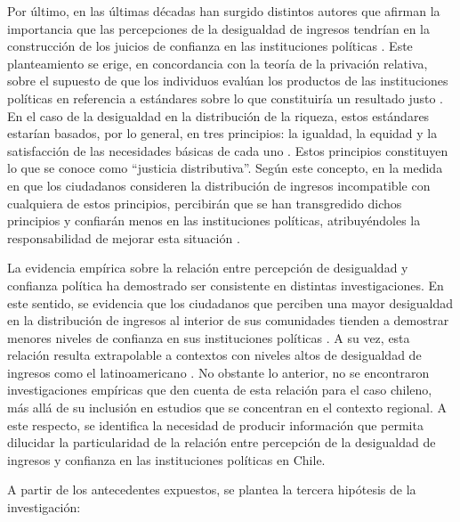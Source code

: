 \documentclass[12pt,twoside]{templates/facsothesis}
\begin{document}
Por último, en las últimas décadas han surgido distintos autores que afirman la importancia que las percepciones de la desigualdad de ingresos tendrían en la construcción de los juicios de confianza en las instituciones políticas \citep{vandermeerEconomicPerformancePolitical2018}. Este planteamiento se erige, en concordancia con la teoría de la privación relativa, sobre el supuesto de que los individuos evalúan los productos de las instituciones políticas en referencia a estándares sobre lo que constituiría un resultado justo \citep{tylerSocialJustice2015}. En el caso de la desigualdad en la distribución de la riqueza, estos estándares estarían basados, por lo general, en tres principios: la igualdad, la equidad y la satisfacción de las necesidades básicas de cada uno \citep{tylerSocialJustice2015, zmerliIncomeInequalityDistributive2015}. Estos principios constituyen lo que se conoce como ``justicia distributiva''. Según este concepto, en la medida en que los ciudadanos consideren la distribución de ingresos incompatible con cualquiera de estos principios, percibirán que se han transgredido dichos principios y confiarán menos en las instituciones políticas, atribuyéndoles la responsabilidad de mejorar esta situación \citep{tylerInfluencePerceivedInjustice1985, zmerliIncomeInequalityDistributive2015}.

La evidencia empírica sobre la relación entre percepción de desigualdad y confianza política ha demostrado ser consistente en distintas investigaciones. En este sentido, se evidencia que los ciudadanos que perciben una mayor desigualdad en la distribución de ingresos al interior de sus comunidades tienden a demostrar menores niveles de confianza en sus instituciones políticas \citep{bobzienIncomeInequalityPolitical2023, gustavssonInequalityTrustSweden2008, leeEconomicPerformanceIncome2020}. A su vez, esta relación resulta extrapolable a contextos con niveles altos de desigualdad de ingresos como el latinoamericano \citep{garcia-sanchezEconomicInequalityUnfairness2025a, wuIncomeInequalityDistributive2019, zmerliIncomeInequalityDistributive2015}. No obstante lo anterior, no se encontraron investigaciones empíricas que den cuenta de esta relación para el caso chileno, más allá de su inclusión en estudios que se concentran en el contexto regional. A este respecto, se identifica la necesidad de producir información que permita dilucidar la particularidad de la relación entre percepción de la desigualdad de ingresos y confianza en las instituciones políticas en Chile.

A partir de los antecedentes expuestos, se plantea la tercera hipótesis de la investigación:
\end{document}
